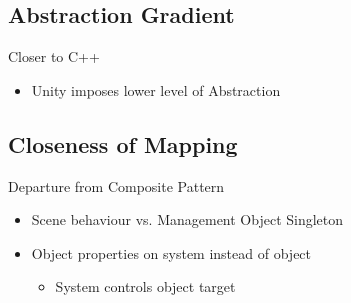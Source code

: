\subsection{Abstraction Gradient}
\begin{frame}{\secname}{\subsecname}
	Closer to C++
	\begin{itemize}
		\item Unity imposes lower level of Abstraction
	\end{itemize}
\end{frame}

\subsection{Closeness of Mapping}
\begin{frame}{\secname}{\subsecname}
	Departure from Composite Pattern
	\begin{itemize}
		\item<2-> Scene behaviour vs. Management Object Singleton
		\item<3-> Object properties on system instead of object
		\begin{itemize}
			\item<3-> System controls object target
		\end{itemize}
	\end{itemize}
\end{frame}

